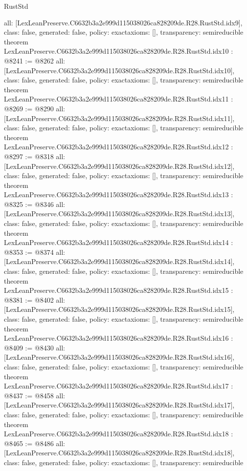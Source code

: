 \begin{lexlean}{RustStd}
\begin{coremodule}
{  all: [LexLeanPreserve.C6632b3a2e999d115038026ca828209de.R28.RustStd.idx9],
  class: false,
  generated: false,
  policy: exact{axioms: []},
  transparency: semireducible
}
theorem LexLeanPreserve.C6632b3a2e999d115038026ca828209de.R28.RustStd.idx10 : @8241 := @8262 {
  all: [LexLeanPreserve.C6632b3a2e999d115038026ca828209de.R28.RustStd.idx10],
  class: false,
  generated: false,
  policy: exact{axioms: []},
  transparency: semireducible
}
theorem LexLeanPreserve.C6632b3a2e999d115038026ca828209de.R28.RustStd.idx11 : @8269 := @8290 {
  all: [LexLeanPreserve.C6632b3a2e999d115038026ca828209de.R28.RustStd.idx11],
  class: false,
  generated: false,
  policy: exact{axioms: []},
  transparency: semireducible
}
theorem LexLeanPreserve.C6632b3a2e999d115038026ca828209de.R28.RustStd.idx12 : @8297 := @8318 {
  all: [LexLeanPreserve.C6632b3a2e999d115038026ca828209de.R28.RustStd.idx12],
  class: false,
  generated: false,
  policy: exact{axioms: []},
  transparency: semireducible
}
theorem LexLeanPreserve.C6632b3a2e999d115038026ca828209de.R28.RustStd.idx13 : @8325 := @8346 {
  all: [LexLeanPreserve.C6632b3a2e999d115038026ca828209de.R28.RustStd.idx13],
  class: false,
  generated: false,
  policy: exact{axioms: []},
  transparency: semireducible
}
theorem LexLeanPreserve.C6632b3a2e999d115038026ca828209de.R28.RustStd.idx14 : @8353 := @8374 {
  all: [LexLeanPreserve.C6632b3a2e999d115038026ca828209de.R28.RustStd.idx14],
  class: false,
  generated: false,
  policy: exact{axioms: []},
  transparency: semireducible
}
theorem LexLeanPreserve.C6632b3a2e999d115038026ca828209de.R28.RustStd.idx15 : @8381 := @8402 {
  all: [LexLeanPreserve.C6632b3a2e999d115038026ca828209de.R28.RustStd.idx15],
  class: false,
  generated: false,
  policy: exact{axioms: []},
  transparency: semireducible
}
theorem LexLeanPreserve.C6632b3a2e999d115038026ca828209de.R28.RustStd.idx16 : @8409 := @8430 {
  all: [LexLeanPreserve.C6632b3a2e999d115038026ca828209de.R28.RustStd.idx16],
  class: false,
  generated: false,
  policy: exact{axioms: []},
  transparency: semireducible
}
theorem LexLeanPreserve.C6632b3a2e999d115038026ca828209de.R28.RustStd.idx17 : @8437 := @8458 {
  all: [LexLeanPreserve.C6632b3a2e999d115038026ca828209de.R28.RustStd.idx17],
  class: false,
  generated: false,
  policy: exact{axioms: []},
  transparency: semireducible
}
theorem LexLeanPreserve.C6632b3a2e999d115038026ca828209de.R28.RustStd.idx18 : @8465 := @8486 {
  all: [LexLeanPreserve.C6632b3a2e999d115038026ca828209de.R28.RustStd.idx18],
  class: false,
  generated: false,
  policy: exact{axioms: []},
  transparency: semireducible
}
\end{coremodule}
\end{lexlean}
